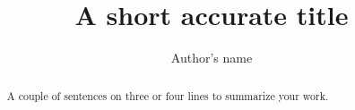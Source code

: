 \documentclass[a4paper,10pt]{report}
\begin{document}
\title{A short accurate title}
\author{Author's name}
\maketitle
\begin{abstract}\centering
A couple of sentences on three or four lines to summarize your work.
\end{abstract}
\tableofcontents




\appendix





\end{document}

